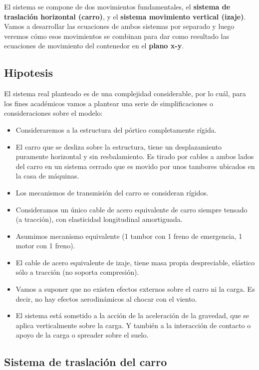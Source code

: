 \documentclass[11pt]{article}
\begin{document}
El sistema se compone de dos movimientos fundamentales, el \textbf{sistema de traslación horizontal (carro)}, y el \textbf{sistema movimiento vertical (izaje)}. Vamos a desarrollar las ecuaciones de ambos sistemas por separado y luego veremos cómo esos movimientos se combinan para dar como resultado las ecuaciones de movimiento del contenedor en el \textbf{plano x-y}.

\subsection{Hipotesis}
El sistema real planteado es de una complejidad considerable, por lo cuál, para los fines académicos vamos a plantear una serie de simplificaciones o consideraciones sobre el modelo:
\begin{itemize}
	\item Consideraremos a la estructura del pórtico completamente rígida.
	\item El carro que se desliza sobre la estructura, tiene un desplazamiento puramente horizontal y sin resbalamiento. Es tirado por cables a ambos lados del carro en un sistema cerrado que es movido por unos tambores ubicados en la casa de máquinas.
	\item Los mecanismos de transmisión del carro se consideran rígidos.
	\item Consideramos un único cable de acero equivalente de carro siempre tensado (a tracción), con elasticidad longitudinal amortiguada.
	\item Asumimos mecanismo equivalente (1 tambor con 1 freno de emergencia, 1 motor con 1 freno).
	\item El cable de acero equivalente de izaje, tiene masa propia despreciable, elástico sólo a tracción (no soporta compresión).
	\item Vamos a suponer que no existen efectos externos sobre el carro ni la carga. Es decir, no hay efectos aerodinámicos al chocar con el viento.
	\item El sistema está sometido a la acción de la aceleración de la gravedad, que se aplica verticalmente sobre la carga. Y también a la interacción de contacto o apoyo de la carga o spreader sobre el suelo.
\end{itemize}

\subsection{Sistema de traslación del carro}
\label{section:carro}
\end{document}
